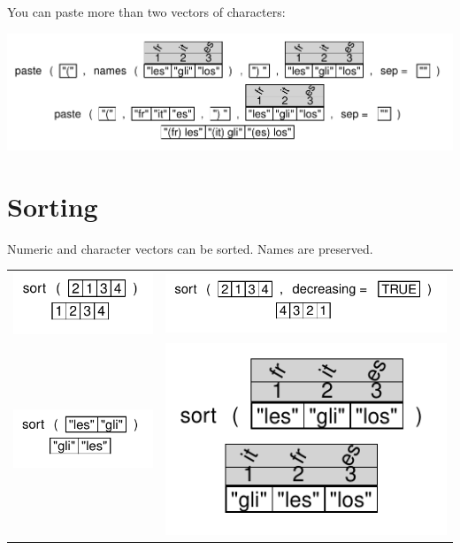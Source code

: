 \documentclass[pdflatex]{article}
\begin{document}
You can paste more than two vectors of characters:

\includegraphics{paste5}

\section{Sorting}

Numeric and character vectors can be sorted. Names are preserved.

\begin{tabular}{cc}
\includegraphics{sort} & \includegraphics{sort2}\\
\includegraphics{sort_char} & \includegraphics{sort_char_names} \\
\end{tabular}
\end{document}
